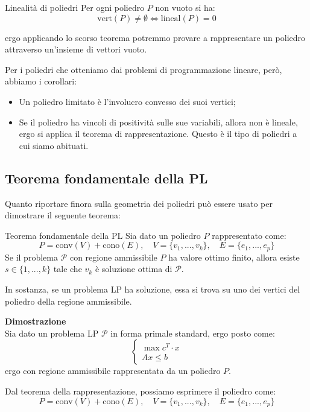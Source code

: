 \documentclass[a4paper,11pt]{article}
\begin{document}
\begin{theorem}{Linealità di poliedri}
	Per ogni poliedro $P$ non vuoto si ha:
	$$
		\mathrm{vert}(P) \neq \emptyset \Leftrightarrow \mathrm{lineal}(P) = {0}
	$$
\end{theorem}
ergo applicando lo scorso teorema potremmo provare a rappresentare un poliedro attraverso un'insieme di vettori vuoto.

Per i poliedri che otteniamo dai problemi di programmazione lineare, però, abbiamo i corollari:
\begin{itemize}
	\item Un poliedro limitato è l'involucro convesso dei suoi vertici;
	\item Se il poliedro ha vincoli di positività sulle sue variabili, allora non è lineale, ergo si applica il teorema di rappresentazione.
		Questo è il tipo di poliedri a cui siamo abituati.
\end{itemize}

\subsection{Teorema fondamentale della PL}
Quanto riportare finora sulla geometria dei poliedri può essere usato per dimostrare il seguente teorema:
\begin{theorem}{Teorema fondamentale della PL}
	Sia dato un poliedro $P$ rappresentato come:
	$$ 
	P = \mathrm{conv}(V) + \mathrm{cono}(E), \quad V = \{ v_1, ..., v_k \}, \quad E = \{ e_1, ..., e_p \}
	$$
	Se il problema $\mathcal{P}$ con regione ammissibile $P$ ha valore ottimo finito, allora esiste $s \in \{ 1, ..., k \}$ tale che $v_k$ è soluzione ottima di $\mathcal{P}$.
\end{theorem}

In sostanza, se un problema LP ha soluzione, essa si trova su uno dei vertici del poliedro della regione ammissibile.

\par\medskip
\noindent
\textbf{\textsf{Dimostrazione}} \\
Sia dato un problema LP $\mathcal{P}$ in forma primale standard, ergo posto come:
\[
	\begin{cases}
		\max{c^T \cdot x} \\ 
		Ax \leq b	
	\end{cases}
\]
ergo con regione ammissibile rappresentata da un poliedro $P$.

Dal teorema della rappresentazione, possiamo esprimere il poliedro come:
$$
	P = \mathrm{conv}(V) + \mathrm{cono}(E), \quad V = \{ v_1, ..., v_k \}, \quad E = \{ e_1, ..., e_p \}
$$
\end{document}
